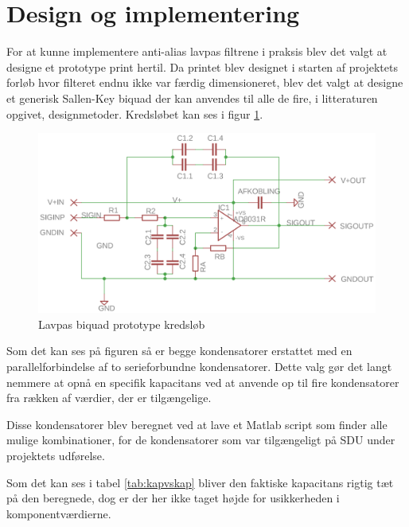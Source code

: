 \section{Design og implementering}\label{sec:filter_design}
For at kunne implementere anti-alias lavpas filtrene i praksis blev det valgt at designe et 
prototype print hertil. Da printet blev designet i starten af projektets forløb hvor filteret 
endnu ikke var færdig dimensioneret, blev det valgt at designe et generisk Sallen-Key biquad 
der kan anvendes til alle de fire, i litteraturen opgivet, designmetoder. Kredsløbet kan ses i 
figur \ref{fig:skbiquadsch}.



\begin{figure}[H]
	\centering
	\includegraphics[width=.7\linewidth]{billeder/skbiquadsch}
	\caption{Lavpas biquad prototype kredsløb}
	\label{fig:skbiquadsch}
\end{figure}

Som det kan ses på figuren så er begge kondensatorer erstattet med en parallelforbindelse af 
to serieforbundne kondensatorer. Dette valg gør det langt nemmere at opnå en specifik 
kapacitans ved at anvende op til fire kondensatorer fra rækken af værdier, der er tilgængelige.

Disse kondensatorer blev beregnet ved at lave et Matlab script som finder alle mulige kombinationer, for de kondensatorer som var tilgængeligt på SDU under projektets udførelse.

Som det kan ses i tabel \ref{tab:kapvskap} bliver den faktiske kapacitans rigtig tæt på den
beregnede, dog er der her ikke taget højde for usikkerheden i komponentværdierne.

